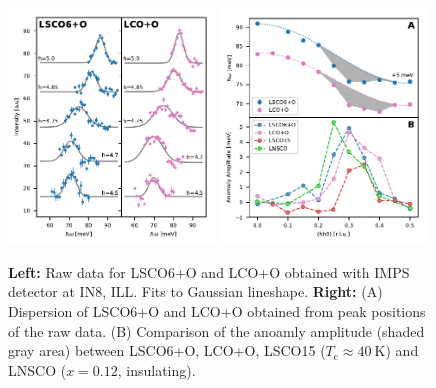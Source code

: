 \begin{figure}
    \centering
    \includegraphics[width=0.49\textwidth]{fig/anomaly/selected.pdf}
    \includegraphics[width=0.49\textwidth]{fig/anomaly/disp_aa_2.pdf}
    \caption[Phonon anomaly data and dispersion]{\textbf{Left:} Raw data for LSCO6+O and LCO+O obtained with IMPS detector at IN8, ILL. Fits to Gaussian lineshape. \textbf{Right:} (A) Dispersion of LSCO6+O and LCO+O obtained from peak positions of the raw data. (B) Comparison of the anoamly amplitude (shaded gray area) between LSCO6+O, LCO+O, LSCO15 ($T_\text{c} \approx \SI{40}{\kelvin}$) and LNSCO ($x=0.12$, insulating).}
    \label{fig:anomaly_rawdata}
\end{figure}

